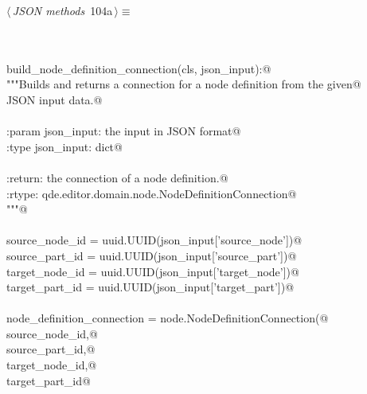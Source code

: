 \documentclass[
    a4paper,      %
    10pt,         %
    openright,    %
    notitlepage,  %
    parskip=half, %
]{scrreprt}       %
\theoremstyle{definition}                    %
\begin{document}
\begin{flushleft} \small
\begin{minipage}{\linewidth}\label{scrap169}\raggedright\small
{} $\langle\,${\itshape JSON methods}\nobreak\ {\footnotesize {104a}}$\,\rangle\equiv$
\vspace{-1exm}
\begin{list}{}{} \item
\mbox{}\lstinline@@\\
\mbox{}\lstinline@classmethod@\\
\mbox{}\lstinline@def build_node_definition_connection(cls, json_input):@\\
\mbox{}\lstinline@    """Builds and returns a connection for a node definition from the given@\\
\mbox{}\lstinline@    JSON input data.@\\
\mbox{}\lstinline@@\\
\mbox{}\lstinline@    :param json_input: the input in JSON format@\\
\mbox{}\lstinline@    :type  json_input: dict@\\
\mbox{}\lstinline@@\\
\mbox{}\lstinline@    :return: the connection of a node definition.@\\
\mbox{}\lstinline@    :rtype:  qde.editor.domain.node.NodeDefinitionConnection@\\
\mbox{}\lstinline@    """@\\
\mbox{}\lstinline@@\\
\mbox{}\lstinline@    source_node_id = uuid.UUID(json_input['source_node'])@\\
\mbox{}\lstinline@    source_part_id = uuid.UUID(json_input['source_part'])@\\
\mbox{}\lstinline@    target_node_id = uuid.UUID(json_input['target_node'])@\\
\mbox{}\lstinline@    target_part_id = uuid.UUID(json_input['target_part'])@\\
\mbox{}\lstinline@@\\
\mbox{}\lstinline@    node_definition_connection = node.NodeDefinitionConnection(@\\
\mbox{}\lstinline@        source_node_id,@\\
\mbox{}\lstinline@        source_part_id,@\\
\mbox{}\lstinline@        target_node_id,@\\
\mbox{}\lstinline@        target_part_id@\\

\end{list}
\end{minipage}
\end{flushleft}
\end{document}
